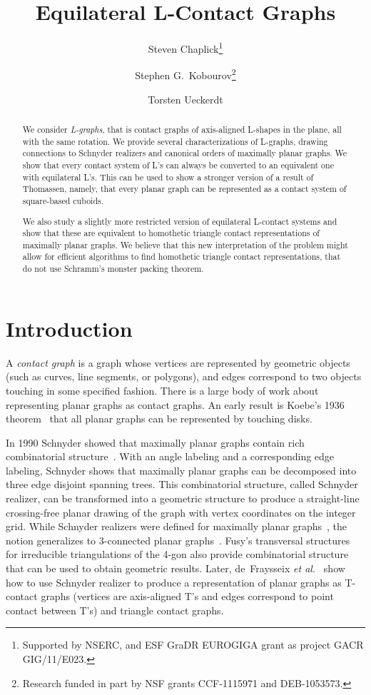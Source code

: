\documentclass{llncs}
\title{Equilateral L-Contact Graphs}
\author{Steven Chaplick\inst{1}\thanks{Supported by NSERC, and ESF GraDR EUROGIGA grant as project GACR GIG/11/E023.}
\and 
Stephen G.~Kobourov\inst{2}\thanks{Research funded in part by NSF grants CCF-1115971 and DEB-1053573.}
\and 
Torsten Ueckerdt\inst{3}
}
\institute{Dept.~of Applied Mathematics, Charles University, Prague, Czech Republic
\and Dept.~of Computer Science, University of Arizona, Tucson AZ, USA \and Dept.~of Mathematics, Karlsruhe Istitute of Technology, Karlsruhe, Germany}
\begin{document}
\date{}


 \maketitle


\begin{abstract}
 We consider {\em L-graphs}, that is contact graphs of axis-aligned L-shapes in the plane, all with the same rotation. We provide several characterizations of L-graphs, drawing connections to Schnyder realizers and canonical orders of maximally planar graphs. We show that every contact system of L's can always be converted to an equivalent one with equilateral L's. This can be used to show a stronger version of a result of Thomassen, namely, that every planar graph can be represented as a contact system of square-based cuboids.
 
We also study a slightly more restricted version of equilateral L-contact systems and show that these are equivalent to homothetic triangle contact representations of maximally planar graphs. We believe that this new interpretation of the problem might allow for efficient algorithms to find homothetic triangle contact representations, that do not use Schramm's monster packing theorem.
\end{abstract}

\section{Introduction}\label{sec:introduction}
A \emph{contact graph} is a graph whose vertices are represented by geometric objects (such as curves, line segments, or polygons), and edges correspond to two objects touching in some specified fashion. There is a large body of work about representing planar graphs as contact graphs. An early result is Koebe's 1936 theorem~\cite{Koebe36} that all planar graphs can be represented by touching disks.

In 1990 Schnyder showed that maximally planar graphs contain rich combinatorial structure~\cite{s-epgg-90}. With an angle labeling and a corresponding edge labeling, Schnyder shows that maximally planar graphs can be decomposed into three edge disjoint spanning trees. This combinatorial structure, called Schnyder realizer, can be transformed into a geometric structure to produce a straight-line crossing-free planar drawing of the graph with vertex coordinates on the integer grid. While Schnyder realizers were defined for maximally planar graphs~\cite{s-epgg-90}, the notion generalizes to $3$-connected planar graphs~\cite{f-lspg-04}. Fusy's transversal structures~\cite{Fusy09} for irreducible triangulations of the 4-gon also provide combinatorial structure that can be used to obtain geometric results. Later, de~Fraysseix {\em et al.}~\cite{FraysseixTContact} show how to use Schnyder realizer to produce a representation of planar graphs as T-contact graphs (vertices are axis-aligned T's and edges correspond to point contact between T's) and triangle contact graphs.
\end{document}
